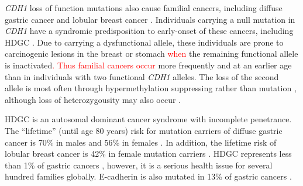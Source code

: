 \textit{CDH1} loss of function \glspl{mutation} also cause \gls{familial} cancers, including diffuse gastric cancer and lobular breast cancer \citep{HDGC,Graziano2003,Guilford2010,Oliveira2009}. Individuals carrying a null \gls{mutation} in \textit{CDH1} have a syndromic predisposition to early-onset of these cancers, including \gls{HDGC} \citep{Guilford1998}. Due to carrying a dysfunctional \gls{allele}, these individuals are prone to carcinogenic lesions in the breast or stomach \textcolor{red}{when} the remaining functional \gls{allele} is inactivated\textcolor{red}{. Thus familial cancers occur} more frequently and at an earlier age than in individuals with two functional \textit{CDH1} \glspl{allele}. The loss of the second \gls{allele} is most often through hypermethylation suppressing  rather than \gls{mutation} \citep{Grady2000, Graziano2003, Oliveira2009, Machado2001}, although loss of heterozygousity may also occur \citep{Guilford2010}. 

\gls{HDGC} is an autosomal dominant cancer syndrome with incomplete penetrance. The ``lifetime'' (until age 80 years) risk for \gls{mutation} carriers  of diffuse gastric cancer is 70\% in males and 56\% in females \citep{Hansford2015,vanderPost2015}. In addition, the lifetime risk of lobular breast cancer is 42\% in female \gls{mutation} carriers \citep{Hansford2015}.   
%
\gls{HDGC} %
represents less than 1\% of gastric cancers \citep{Ferlay2015}, however, it is a serious health issue for several hundred families globally. 
\gls{E-cadherin} is also mutated in 13\% of  gastric cancers \citep{Ferlay2015}.

